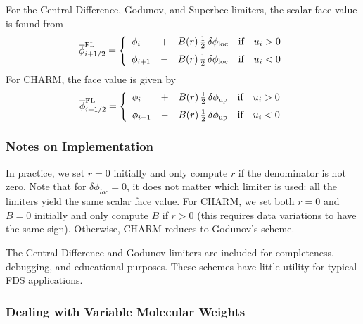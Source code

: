\noindent For the Central Difference, Godunov, and Superbee limiters, the scalar face value is found from
\begin{equation}
\label{eqn_flux_limiter}
\overline{\phi}^{\rm FL}_{i+1/2} = \left\{ \begin{array}{lcll} \phi_i &+& B(r) \,\frac{1}{2} \,\delta \phi_{\rm loc} & \mbox{if} \quad u_i>0 \vspace{0.2 cm}\\
\phi_{i+1} &-& B(r) \,\frac{1}{2} \,\delta \phi_{\rm loc} & \mbox{if} \quad u_i<0 \end{array} \right.
\end{equation}
For CHARM, the face value is given by~\cite{Kempf:2003}
\begin{equation}
\label{eqn_charm_limiter}
\overline{\phi}^{\rm FL}_{i+1/2} = \left\{ \begin{array}{lcll} \phi_i &+& B(r) \,\frac{1}{2} \,\delta \phi_{\rm up} & \mbox{if} \quad u_i>0 \vspace{0.2 cm}\\
\phi_{i+1} &-& B(r) \,\frac{1}{2} \,\delta \phi_{\rm up} & \mbox{if} \quad u_i<0 \end{array} \right.
\end{equation}


\subsubsection{Notes on Implementation}

In practice, we set $r=0$ initially and only compute $r$ if the denominator is not zero.  Note that for $\delta \phi_{loc}=0$, it does not matter which limiter is used: all the limiters yield the same scalar face value.  For CHARM, we set both $r=0$ and $B=0$ initially and only compute $B$ if $r>0$ (this requires data variations to have the same sign). Otherwise, CHARM reduces to Godunov's scheme.

The Central Difference and Godunov limiters are included for completeness, debugging, and educational purposes.  These schemes have little utility for typical FDS applications.

\subsubsection{Dealing with Variable Molecular Weights}

